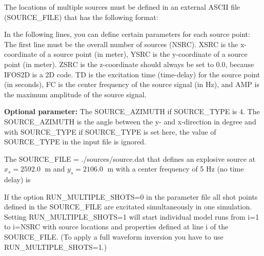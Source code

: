 The locations of multiple sources must be defined in an external ASCII file (SOURCE\_FILE) that has the following format:
{\color{blue}{\begin{verbatim}
NSRC
  % 	XSRC		ZSRC		YSRC		TD		FC		AMP  	SOURCE_AZIMUTH		SOURCE_TYPE	(NSRC lines)
\end{verbatim}}}

In the following lines, you can define certain parameters for each source point:\\
The first line must be the overall number of sources (NSRC). XSRC is the x-coordinate of a source point (in meter), YSRC is the y-coordinate of a source point (in meter). ZSRC is the z-coordinate should always be set to 0.0, because IFOS2D is a 2D code. TD is the excitation time (time-delay) for the source point (in seconds), FC is the center frequency of the source signal (in Hz), and AMP is the maximum amplitude of the source signal.
\newline

\textbf{Optional parameter:} The SOURCE\_AZIMUTH if SOURCE\_TYPE is 4. The SOURCE\_AZIMUTH is the angle between the y- and x-direction in degree and with SOURCE\_TYPE if SOURCE\_TYPE is set here, the value of SOURCE\_TYPE in the input file is ignored.

The SOURCE\_FILE = ./sources/source.dat that defines an explosive source  at $x_s=2592.0\;$ m and $y_s=2106.0\;$ m with
a center frequency of 5 Hz (no time delay) is
{\color{blue}{\begin{verbatim}
	2592.0        0.0        2106.0        0.0           5.0           1.0
\end{verbatim}}}

If the option RUN\_MULTIPLE\_SHOTS=0 in the parameter file all shot points defined in the SOURCE\_FILE are excitated simultaneously in one simulation. Setting RUN\_MULTIPLE\_SHOTS=1 will start individual model runs from i=1 to i=NSRC with source locations and properties defined at line i of the SOURCE\_FILE. (To apply a full waveform inversion you have to use RUN\_MULTIPLE\_SHOTS=1.) 

% 

